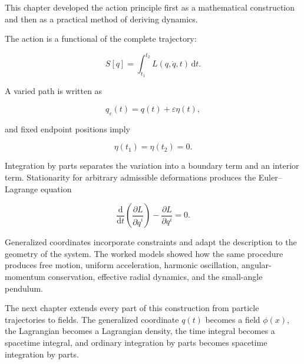 This chapter developed the action principle first as a mathematical construction and then as a practical method of deriving dynamics.

The action is a functional of the complete trajectory:

\[
S[q]
=
\int_{t_{1}}^{t_{2}}
L(q,\dot q,t)
\,\mathrm{d}t.
\]

A varied path is written as

\[
q_{\varepsilon}(t)
=
q(t)+\varepsilon\eta(t),
\]

and fixed endpoint positions imply

\[
\eta(t_{1})=\eta(t_{2})=0.
\]

Integration by parts separates the variation into a boundary term and an interior term. Stationarity for arbitrary admissible deformations produces the Euler--Lagrange equation

\[
\boxed{
\frac{\mathrm{d}}{\mathrm{d}t}
\left(
\frac{\partial L}{\partial\dot q^{i}}
\right)
-
\frac{\partial L}{\partial q^{i}}
=0
}.
\]

Generalized coordinates incorporate constraints and adapt the description to the geometry of the system. The worked models showed how the same procedure produces free motion, uniform acceleration, harmonic oscillation, angular-momentum conservation, effective radial dynamics, and the small-angle pendulum.

The next chapter extends every part of this construction from particle trajectories to fields. The generalized coordinate \(q(t)\) becomes a field \(\phi(x)\), the Lagrangian becomes a Lagrangian density, the time integral becomes a spacetime integral, and ordinary integration by parts becomes spacetime integration by parts.